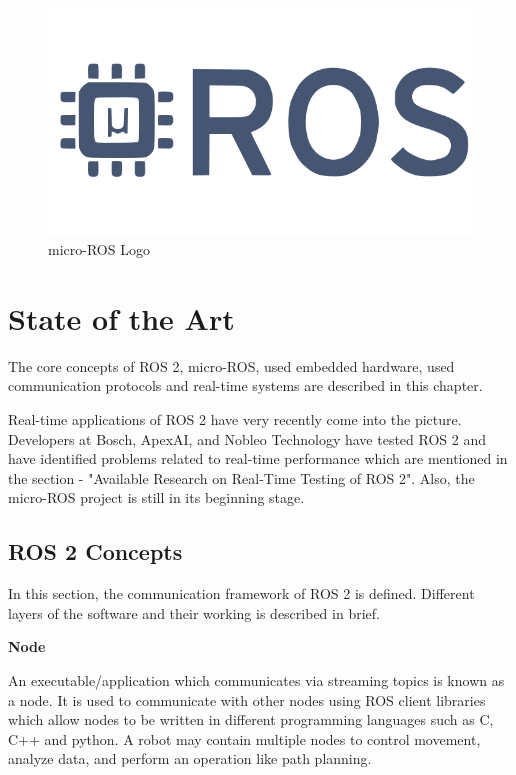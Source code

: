 \documentclass[%
xelatex,
	oneside,		%
	12pt,			%
	parskip=half,	%
	abstracton,
	chapterprefix=true%
    appendixprefix=true]
{scrbook}
\begin{document}
\begin{figure}[ht]
\begin{center}
\includegraphics[scale=.3]{fig/microROS-big-logo.png}
\caption[micro-ROS Logo]{micro-ROS Logo \cite{uroslogo}}
\label{fig:uros}
\end{center}
\end{figure} 
	 
	\chapter{State of the Art}	

\rofoot[\pagemark]{\pagemark}
The core concepts of ROS 2, micro-ROS, used embedded hardware, used communication protocols and real-time systems are described in this chapter.

Real-time applications of ROS 2 have very recently come into the picture. Developers at Bosch, ApexAI, and Nobleo Technology have tested ROS 2 and have identified problems related to real-time performance which are mentioned in the section - "Available Research on Real-Time Testing of ROS 2". Also, the micro-ROS project is still in its beginning stage.
 
	\section{ROS 2 Concepts}
	
	\vspace*{0.5cm}
	In this section, the communication framework of ROS 2 is defined. Different layers of the software and their working is described in brief.
	
	
	\vspace*{0.5cm}
	{\bfseries Node}
	
	
	\vspace*{0.5cm}
An executable/application which communicates via streaming topics is known as a node.
It is used to communicate with other nodes using ROS client libraries which allow nodes to be written in different programming languages such as C, C++ and python. A robot may contain multiple nodes to control movement, analyze data, and perform an operation like path planning.
\end{document}
